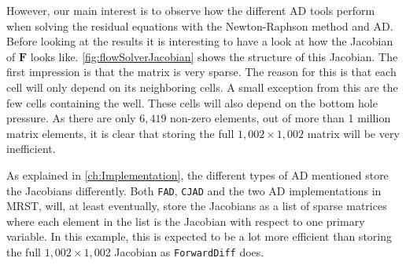 However, our main interest is to observe how the different AD tools perform when solving the residual equations with the Newton-Raphson method and AD. Before looking at the results it is interesting to have a look at how the Jacobian of $\boldsymbol{F}$ looks like. \autoref{fig:flowSolverJacobian} shows the structure of this Jacobian. The first impression is that the matrix is very sparse. The reason for this is that each cell will only depend on its neighboring cells. A small exception from this are the few cells containing the well. These cells will also depend on the bottom hole pressure. As there are only $6,419$ non-zero elements, out of more than 1 million matrix elements, it is clear that storing the full $1,002\times 1,002$ matrix will be very inefficient.

As explained in \autoref{ch:Implementation}, the different types of AD mentioned store the Jacobians differently. Both \texttt{FAD}, \texttt{CJAD} and the two AD implementations in MRST, will, at least eventually, store the Jacobians as a list of sparse matrices where each element in the list is the Jacobian with respect to one primary variable. In this example, this is expected to be a lot more efficient than storing the full $1,002\times 1,002$ Jacobian as  \texttt{ForwardDiff} does.

